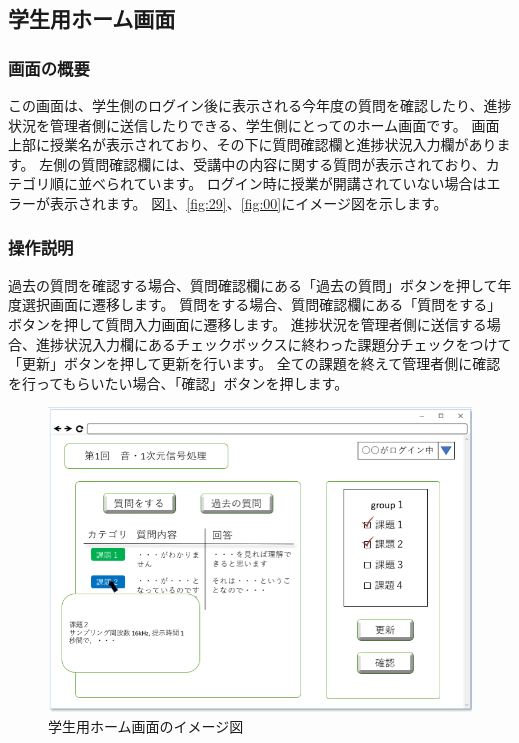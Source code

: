 \subsection{学生用ホーム画面}
\subsubsection{画面の概要}
この画面は、学生側のログイン後に表示される今年度の質問を確認したり、進捗状況を管理者側に送信したりできる、学生側にとってのホーム画面です。
画面上部に授業名が表示されており、その下に質問確認欄と進捗状況入力欄があります。
左側の質問確認欄には、受講中の内容に関する質問が表示されており、カテゴリ順に並べられています。
ログイン時に授業が開講されていない場合はエラーが表示されます。
図\ref{fig:28}、\ref{fig:29}、\ref{fig:00}にイメージ図を示します。

\subsubsection{操作説明}
過去の質問を確認する場合、質問確認欄にある「過去の質問」ボタンを押して年度選択画面に遷移します。
質問をする場合、質問確認欄にある「質問をする」ボタンを押して質問入力画面に遷移します。
進捗状況を管理者側に送信する場合、進捗状況入力欄にあるチェックボックスに終わった課題分チェックをつけて「更新」ボタンを押して更新を行います。
全ての課題を終えて管理者側に確認を行ってもらいたい場合、「確認」ボタンを押します。

\begin{figure}[phtbp]
  \begin{center}
    \includegraphics[width=1\linewidth,clip]{./img/28.png}
    \caption{学生用ホーム画面のイメージ図}\label{fig:28}
  \end{center}
\end{figure}

